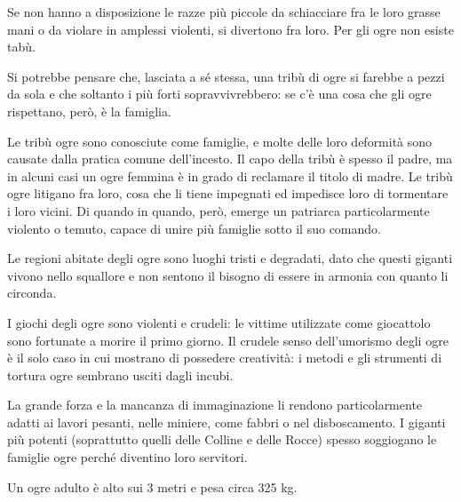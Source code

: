 \begin{multicols}{2}
{Se non hanno a disposizione le razze più piccole da schiacciare fra le loro grasse mani o da violare in amplessi violenti, si divertono fra loro. Per gli ogre non esiste tabù.

Si potrebbe pensare che, lasciata a sé stessa, una tribù di ogre si farebbe a pezzi da sola e che soltanto i più forti sopravvivrebbero: se c'è una cosa che gli ogre rispettano, però, è la famiglia.

Le tribù ogre sono conosciute come famiglie, e molte delle loro deformità sono causate dalla pratica comune dell'incesto.
Il capo della tribù è spesso il padre, ma in alcuni casi un ogre femmina è in grado di reclamare il titolo di madre. Le tribù ogre litigano fra loro, cosa che li tiene impegnati ed impedisce loro di tormentare i loro vicini. Di quando in quando, però, emerge un patriarca particolarmente violento o temuto, capace di unire più famiglie sotto il suo comando.


Le regioni abitate degli ogre sono luoghi tristi e degradati, dato che questi giganti vivono nello squallore e non sentono il bisogno di essere in armonia con quanto li circonda.

I giochi degli ogre sono violenti e crudeli: le vittime utilizzate come giocattolo sono fortunate a morire il primo giorno. Il crudele senso dell'umorismo degli ogre è il solo caso in cui mostrano di possedere creatività: i metodi e gli strumenti di tortura ogre sembrano usciti dagli incubi.

La grande forza e la mancanza di immaginazione li rendono particolarmente adatti ai lavori pesanti, nelle miniere, come fabbri o nel disboscamento. I giganti più potenti (soprattutto quelli delle Colline e delle Rocce) spesso soggiogano le famiglie ogre perché diventino loro servitori.

Un ogre adulto è alto sui 3 metri e pesa circa 325 kg.


}
\end{multicols}
